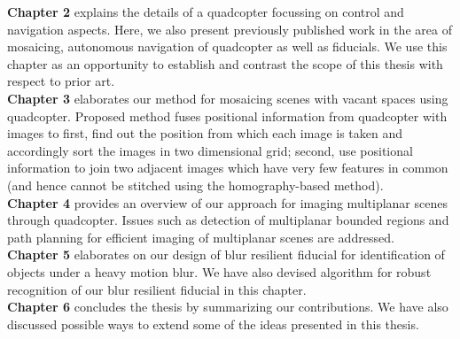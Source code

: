 \noindent \textbf{Chapter 2} explains the details of a quadcopter focussing on
control and navigation aspects. Here, we also present previously published work
in the area of mosaicing, autonomous navigation of quadcopter as well as
fiducials. We use this chapter as an opportunity to establish and contrast the
scope of this thesis with respect to prior art.\\

\noindent \textbf{Chapter 3} elaborates our method for mosaicing
scenes with vacant spaces using quadcopter. Proposed method fuses positional
information from quadcopter with images to first, find out the position from which each
image is taken and accordingly sort the images in two dimensional grid; second,
use positional information to join two adjacent images which have very few features
in common (and hence cannot be stitched using the homography-based method).\\

\noindent \textbf{Chapter 4} provides an overview of our approach
for imaging multiplanar scenes through quadcopter. Issues such as detection of
multiplanar bounded regions and path planning for efficient imaging of multiplanar scenes
are addressed.\\

\noindent \textbf{Chapter 5} elaborates on our design of blur
resilient fiducial for identification of objects under a heavy motion blur. We
have also devised algorithm for robust recognition of our blur resilient
fiducial in this chapter.\\
 
 \noindent \textbf{Chapter 6} concludes the thesis by summarizing our
 contributions. We have also discussed possible ways to extend some of the
 ideas presented in this thesis.
